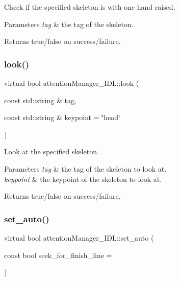 Check if the specified skeleton is with one hand raised. 


\begin{DoxyParams}{Parameters}
{\em tag} & the tag of the skeleton. \\
\hline
\end{DoxyParams}
\begin{DoxyReturn}{Returns}
true/false on success/failure. 
\end{DoxyReturn}
\mbox{\label{classattentionManager__IDL_a42941cc508bb57aa390578ecdbfde7c2}} 
\subsubsection{\texorpdfstring{look()}{look()}}
{\footnotesize\ttfamily virtual bool attention\+Manager\+\_\+\+I\+D\+L\+::look (\begin{DoxyParamCaption}\item[{const std\+::string \&}]{tag,  }\item[{const std\+::string \&}]{keypoint = {\ttfamily \char`\"{}head\char`\"{}} }\end{DoxyParamCaption})\hspace{0.3cm}{\ttfamily [virtual]}}



Look at the specified skeleton. 


\begin{DoxyParams}{Parameters}
{\em tag} & the tag of the skeleton to look at. \\
\hline
{\em keypoint} & the keypoint of the skeleton to look at. \\
\hline
\end{DoxyParams}
\begin{DoxyReturn}{Returns}
true/false on success/failure. 
\end{DoxyReturn}
\mbox{\label{classattentionManager__IDL_af154c2ce288ff7ac68618f1c87155e91}} 
\subsubsection{\texorpdfstring{set\+\_\+auto()}{set\_auto()}}
{\footnotesize\ttfamily virtual bool attention\+Manager\+\_\+\+I\+D\+L\+::set\+\_\+auto (\begin{DoxyParamCaption}\item[{const bool}]{seek\+\_\+for\+\_\+finish\+\_\+line = {} }\end{DoxyParamCaption})\hspace{0.3cm}{\ttfamily [virtual]}}



